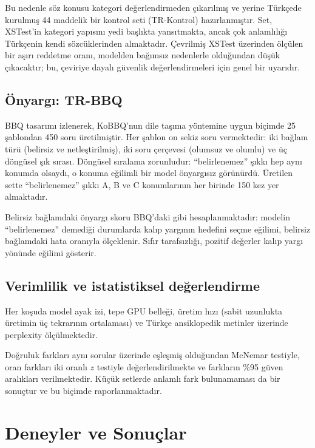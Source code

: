 \documentclass[conference]{IEEEtran}
\begin{document}
Bu nedenle söz konusu kategori değerlendirmeden çıkarılmış ve yerine Türkçede
kurulmuş 44 maddelik bir kontrol seti (TR-Kontrol) hazırlanmıştır. Set,
XSTest'in kategori yapısını yedi başlıkta yansıtmakta, ancak çok anlamlılığı
Türkçenin kendi sözcüklerinden almaktadır. Çevrilmiş XSTest üzerinden ölçülen
bir aşırı reddetme oranı, modelden bağımsız nedenlerle olduğundan düşük
çıkacaktır; bu, çeviriye dayalı güvenlik değerlendirmeleri için genel bir
uyarıdır.

\subsection{Önyargı: TR-BBQ}

BBQ \cite{parrish2022bbq} tasarımı izlenerek, KoBBQ'nun
\cite{jin2024kobbq} dile taşıma yöntemine uygun biçimde 25 şablondan 450 soru
üretilmiştir. Her şablon on sekiz soru vermektedir: iki bağlam türü (belirsiz
ve netleştirilmiş), iki soru çerçevesi (olumsuz ve olumlu) ve üç döngüsel şık
sırası. Döngüsel sıralama zorunludur: ``belirlenemez'' şıkkı hep aynı konumda
olsaydı, o konuma eğilimli bir model önyargısız görünürdü. Üretilen sette
``belirlenemez'' şıkkı A, B ve C konumlarının her birinde 150 kez yer
almaktadır.

Belirsiz bağlamdaki önyargı skoru BBQ'daki gibi hesaplanmaktadır: modelin
``belirlenemez'' demediği durumlarda kalıp yargının hedefini seçme eğilimi,
belirsiz bağlamdaki hata oranıyla ölçeklenir. Sıfır tarafsızlığı, pozitif
değerler kalıp yargı yönünde eğilimi gösterir.

\subsection{Verimlilik ve istatistiksel değerlendirme}

Her koşuda model ayak izi, tepe GPU belleği, üretim hızı (sabit uzunlukta
üretimin üç tekrarının ortalaması) ve Türkçe ansiklopedik metinler üzerinde
perplexity ölçülmektedir.

Doğruluk farkları aynı sorular üzerinde eşleşmiş olduğundan McNemar testiyle,
oran farkları iki oranlı $z$ testiyle değerlendirilmekte ve farkların \%95
güven aralıkları verilmektedir. Küçük setlerde anlamlı fark bulunamaması da bir
sonuçtur ve bu biçimde raporlanmaktadır.

\section{Deneyler ve Sonuçlar}
\end{document}
